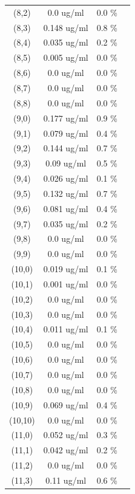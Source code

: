 \documentclass{article}
\begin{document}
\begin{tabular}{c c c c}
(8,2)&        0.0 ug/ml        &0.0 \%\\
(8,3)&        0.148 ug/ml        &0.8 \%\\
(8,4)&        0.035 ug/ml        &0.2 \%\\
(8,5)&        0.005 ug/ml        &0.0 \%\\
(8,6)&        0.0 ug/ml        &0.0 \%\\
(8,7)&        0.0 ug/ml        &0.0 \%\\
(8,8)&        0.0 ug/ml        &0.0 \%\\
(9,0)&        0.177 ug/ml        &0.9 \%\\
(9,1)&        0.079 ug/ml        &0.4 \%\\
(9,2)&        0.144 ug/ml        &0.7 \%\\
(9,3)&        0.09 ug/ml        &0.5 \%\\
(9,4)&        0.026 ug/ml        &0.1 \%\\
(9,5)&        0.132 ug/ml        &0.7 \%\\
(9,6)&        0.081 ug/ml        &0.4 \%\\
(9,7)&        0.035 ug/ml        &0.2 \%\\
(9,8)&        0.0 ug/ml        &0.0 \%\\
(9,9)&        0.0 ug/ml        &0.0 \%\\
(10,0)&        0.019 ug/ml        &0.1 \%\\
(10,1)&        0.001 ug/ml        &0.0 \%\\
(10,2)&        0.0 ug/ml        &0.0 \%\\
(10,3)&        0.0 ug/ml        &0.0 \%\\
(10,4)&        0.011 ug/ml        &0.1 \%\\
(10,5)&        0.0 ug/ml        &0.0 \%\\
(10,6)&        0.0 ug/ml        &0.0 \%\\
(10,7)&        0.0 ug/ml        &0.0 \%\\
(10,8)&        0.0 ug/ml        &0.0 \%\\
(10,9)&        0.069 ug/ml        &0.4 \%\\
(10,10)&        0.0 ug/ml        &0.0 \%\\
(11,0)&        0.052 ug/ml        &0.3 \%\\
(11,1)&        0.042 ug/ml        &0.2 \%\\
(11,2)&        0.0 ug/ml        &0.0 \%\\
(11,3)&        0.11 ug/ml        &0.6 \%\\

\end{tabular}
\end{document}
